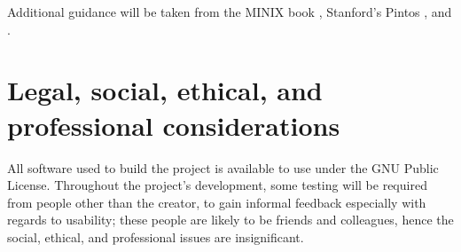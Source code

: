 \documentclass[10pt,a4paper]{article}
\begin{document}
Additional guidance will be taken from the MINIX book \cite{MINIX}, Stanford's
Pintos \cite{Pintos}, and \cite{jsandler}.

\section*{Legal, social, ethical, and professional  considerations}
All software used to build the project is available to use under the GNU Public
License. Throughout the project's development, some testing will be required
from people other than the creator, to gain informal feedback especially with
regards to usability; these people are likely to be friends and colleagues,
hence the social, ethical, and professional issues are insignificant.


\end{document}
